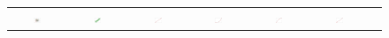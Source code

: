 \documentclass[letterpaper, 10 pt, conference]{ieeeconf}  %
\begin{document}
\begin{figure}[t!]
	\setlength{\tabcolsep}{0.5pt}  %
	\begin{center}	
		\begin{tabular}{cc|ccccc}
			\hline
			\includegraphics[width=0.139\textwidth]{synth_data.png} &
			\includegraphics[width=0.139\textwidth]{synth_alignment.png} &
			\includegraphics[width=0.139\textwidth]{synth_fat_proto_00.png} &
			\includegraphics[width=0.139\textwidth]{synth_fat_proto_01.png} &
			\includegraphics[width=0.139\textwidth]{synth_fat_proto_02.png} &
			\includegraphics[width=0.139\textwidth]{synth_fat_proto_03.png} & \\
			

\end{tabular}
\end{center}
\end{figure}
\end{document}
